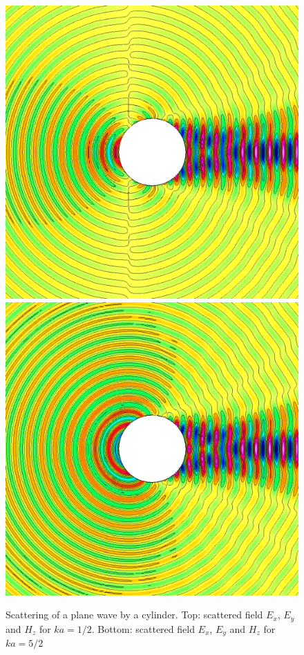 \begin{figure}
\begin{center}
\includegraphics[width=\figWidth]{figures/scatCyl-cibc2a-order4-k5-Ey}
\includegraphics[width=\figWidth]{figures/scatCyl-cibc2a-order4-k5-Hz}
% 
\end{center}
\caption{Scattering of a plane wave by a cylinder. Top: scattered field $E_x$, $E_y$ and $H_z$ for $k a = 1/2$.
           Bottom: scattered field $E_x$, $E_y$ and $H_z$ for $k a = 5/2$}
\end{figure}

